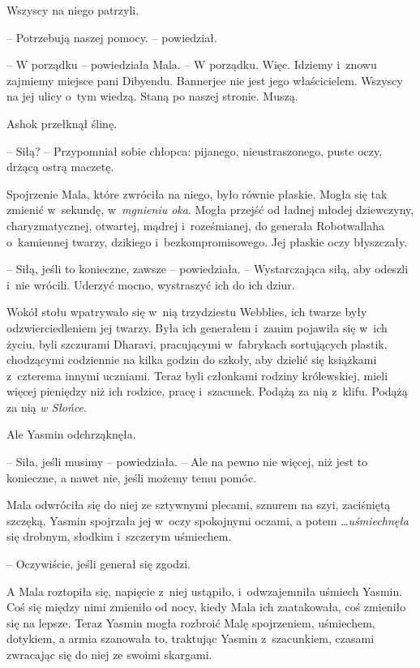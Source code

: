 \documentclass[oneside,polish,11pt,rmheadings]{mwbk}
\begin{document}
Wszyscy na niego patrzyli.

-- Potrzebują naszej pomocy. -- powiedział.

-- W porządku -- powiedziała Mala. -- W porządku. Więc. Idziemy i~znowu zajmiemy miejsce pani Dibyendu. Bannerjee nie jest jego właścicielem. Wszyscy na jej ulicy o~tym wiedzą. Staną po naszej stronie. Muszą.

Ashok przełknął ślinę. 

-- Siłą? -- Przypomniał sobie chłopca: pijanego, nieustraszonego, puste oczy, drżącą ostrą maczetę.

Spojrzenie Mala, które zwróciła na niego, było równie płaskie. Mogła się tak zmienić w~sekundę, w~\textit{mgnieniu oka}. Mogła przejść od ładnej młodej dziewczyny, charyzmatycznej, otwartej, mądrej i~roześmianej, do generała Robotwallaha o~kamiennej twarzy, dzikiego i~bezkompromisowego. Jej płaskie oczy błyszczały.

-- Siłą, jeśli to konieczne, zawsze -- powiedziała. -- Wystarczająca siłą, aby odeszli i~nie wrócili. Uderzyć mocno, wystraszyć ich do ich dziur. 

 Wokół stołu wpatrywało się w~nią trzydziestu Webblies, ich twarze były odzwierciedleniem jej twarzy. Była ich generałem i~zanim pojawiła się w~ich życiu, byli szczurami Dharavi, pracującymi w~fabrykach sortujących plastik, chodzącymi codziennie na kilka godzin do szkoły, aby dzielić się książkami z~czterema innymi uczniami. Teraz byli członkami rodziny królewskiej, mieli więcej pieniędzy niż ich rodzice, pracę i~szacunek. Podążą za nią z~klifu. Podążą za nią \textit{w Słońce}.

Ale Yasmin odchrząknęła. 

-- Siła, jeśli musimy -- powiedziała. -- Ale na pewno nie więcej, niż jest to konieczne, a nawet nie, jeśli możemy temu pomóc.

Mala odwróciła się do niej ze sztywnymi plecami, sznurem na szyi, zaciśniętą szczęką. Yasmin spojrzała jej w~oczy spokojnymi oczami, a potem \ldots  \textit{uśmiechnęła }się drobnym, słodkim i~szczerym uśmiechem. 

-- Oczywiście, jeśli generał się zgodzi.

A Mala roztopiła się, napięcie z~niej ustąpiło, i~odwzajemniła uśmiech Yasmin. Coś się między nimi zmieniło od nocy, kiedy Mala ich zaatakowała, coś zmieniło się na lepsze. Teraz Yasmin mogła rozbroić Malę spojrzeniem, uśmiechem, dotykiem, a armia szanowała to, traktując Yasmin z~szacunkiem, czasami zwracając się do niej ze swoimi skargami.
\end{document}
